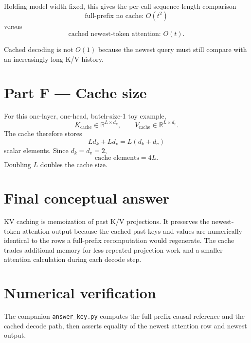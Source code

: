 \documentclass[11pt]{article}
\begin{document}
Holding model width fixed, this gives the per-call sequence-length comparison
\[
\boxed{\text{full-prefix no cache: }O(t^2)}
\]
versus
\[
\boxed{\text{cached newest-token attention: }O(t)}.
\]

Cached decoding is not $O(1)$ because the newest query must still compare with an increasingly long K/V history.

\section*{Part F --- Cache size}

For this one-layer, one-head, batch-size-1 toy example,
\[
K_{\mathrm{cache}}\in\mathbb{R}^{L\times d_k},\qquad
V_{\mathrm{cache}}\in\mathbb{R}^{L\times d_v}.
\]
The cache therefore stores
\[
Ld_k+Ld_v=L(d_k+d_v)
\]
scalar elements. Since $d_k=d_v=2$,
\[
\boxed{\text{cache elements}=4L}.
\]
Doubling $L$ doubles the cache size.

\section*{Final conceptual answer}

KV caching is memoization of past K/V projections. It preserves the newest-token attention output because the cached past keys and values are numerically identical to the rows a full-prefix recomputation would regenerate. The cache trades additional memory for less repeated projection work and a smaller attention calculation during each decode step.

\section*{Numerical verification}

The companion \texttt{answer\_key.py} computes the full-prefix causal reference and the cached decode path, then asserts equality of the newest attention row and newest output.
\end{document}
